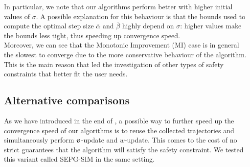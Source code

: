 In particular, we note that our algorithms perform better with higher initial values of $\sigma$. A possible explanation for this behaviour is that the bounds used to compute the optimal step size $\overline{\alpha}$ and $\overline{\beta}$ highly depend on $\sigma$: higher values make the bounds less tight, thus speeding up convergence speed.\\
Moreover, we can see that the Monotonic Improvement (MI) case is in general the slowest to converge due to the more conservative behaviour of the algorithm. This is the main reason that led the investigation of other types of safety constraints that better fit the user needs.


\begin{table}[t]

\caption{Upper bound confidence intervals at 95\% of $|\vv - \vv^*|$ after 10,000 iterations.}\label{exp:convergence-speed}
\end{table}


\subsection{Alternative comparisons}

As we have introduced in the end of , a possible way to further speed up the convergence speed of our algorithms is to reuse the collected trajectories and simultaneously perform $\boldsymbol{v}$-update and $w$-update. This comes to the cost of no strict guarantees that the algorithm will satisfy the safety constraint. We tested this variant called SEPG-SIM in the same setting.

